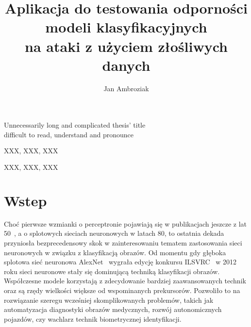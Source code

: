 \documentclass[
    left=2.5cm,         %
    right=2.5cm,        %
    top=2.5cm,          %
    bottom=3cm,         %
    bindingoffset=6mm,  %
    nohyphenation=false %
]{eiti/eiti-thesis}
\begin{document}
\EngineerThesis %
{}
\title
{
    Aplikacja do testowania odporności modeli klasyfikacyjnych \\
    na ataki z użyciem złośliwych danych \\
}

\engtitle
{ %
    Unnecessarily long and complicated thesis' title \\
    difficult to read, understand and pronounce
}

\author{Jan Ambroziak}
\date{\the\year}
\maketitle

\cleardoublepage %
\streszczenie \lipsum[1-3]
\slowakluczowe XXX, XXX, XXX

\newpage
\abstract \kant[1-3]
\keywords XXX, XXX, XXX

\cleardoublepage  %
\pagestyle{plain}
\makeauthorship

\cleardoublepage %
\tableofcontents

\cleardoublepage %
\pagestyle{headings}

\section{Wstep}
Choć pierwsze wzmianki o perceptronie pojawiają się w publikacjach jeszcze z lat 50~\cite{TIBKAT:271027045},
a o splotowych sieciach neuronowych w latach 80\cite{doi:10.1162/neco.1989.1.4.541}, to ostatnia dekada przyniosła bezprecedensowy skok w zainteresowaniu
tematem zastosowania sieci neuronowych w związku z klasyfikacją obrazów.
Od momentu gdy głęboka splotowa sieć neuronowa AlexNet~\cite{NIPS2012_4824} wygrała edycję konkursu ILSVRC~\cite{ILSVRC15} w 2012 roku sieci neuronowe stały się
dominującą techniką klasyfikacji obrazów.
Współczesne modele korzystają z zdecydowanie bardziej zaawansowanych technik oraz są rzędy wielkości większe
od wspominanych prekursorów.
Pozwoliło to na rozwiązanie szeregu wcześniej skomplikowanych problemów, takich jak automatyzacja diagnostyki obrazów medycznych,
rozwój autonomicznych pojazdów, czy wachlarz technik biometrycznej identyfikacji.
\end{document}

